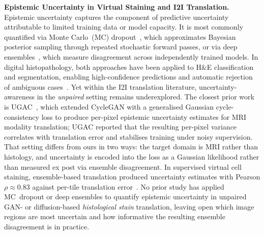 \noindent\textbf{Epistemic Uncertainty in Virtual Staining and I2I Translation.}
Epistemic uncertainty captures the component of predictive uncertainty attributable to
limited training data or model capacity. It is most commonly quantified via Monte
Carlo~(MC) dropout~\cite{gal2016dropout}, which approximates Bayesian posterior sampling
through repeated stochastic forward passes, or via deep
ensembles~\cite{lakshminarayanan2017simple}, which measure disagreement across
independently trained models.
In digital histopathology, both approaches have been applied to H\&E classification and
segmentation, enabling high-confidence predictions and automatic rejection of ambiguous
cases~\cite{uncertainty_informed_hist2022}.
Yet within the I2I translation literature, uncertainty-awareness in the \textit{unpaired}
setting remains underexplored.
The closest prior work is UGAC~\cite{ugac2021}, which extended CycleGAN with a
generalised Gaussian cycle-consistency loss to produce per-pixel epistemic uncertainty
estimates for MRI modality translation; UGAC reported that the resulting per-pixel
variance correlates with translation error and stabilises training under noisy
supervision.
That setting differs from ours in two ways: the target domain is MRI rather than
histology, and uncertainty is encoded into the loss as a Gaussian likelihood rather than
measured ex post via ensemble disagreement.
In supervised virtual cell staining, ensemble-based translation produced uncertainty
estimates with Pearson $\rho{\approx}0.83$ against per-tile translation
error~\cite{insilicolabeling2023}.
No prior study has applied MC~dropout or deep ensembles to quantify epistemic
uncertainty in unpaired GAN- or diffusion-based \textit{histological stain} translation,
leaving open which image regions are most uncertain and how informative the resulting
ensemble disagreement is in practice.
%
% 
%
%
%
